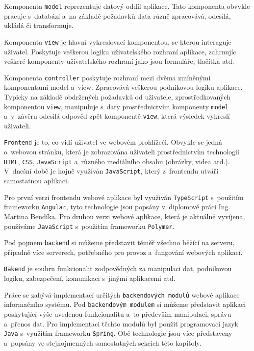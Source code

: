 \documentclass[twoside, 12pt]{article}
\begin{document}
{Komponenta \texttt{model} reprezentuje datový oddíl aplikace.
Tato komponenta obvykle pracuje s~databází a~na základě požadavků
data různě zpracovává, odesílá, ukládá či transformuje.

Komponenta \texttt{view} je hlavní vykreslovací komponentou, se kterou interaguje uživatel.
Poskytuje veškerou logiku uživatelského rozhraní aplikace,
zahrnujíc veškeré komponenty uživatelského rozhraní jako jsou formuláře, tlačítka
atd.

Komponenta \texttt{controller} poskytuje rozhraní mezi dvěma zmíněnými komponentami
model a~view. Zpracovává veškerou podnikovou logiku aplikace.
Typicky na základě obdržených požadavků od uživatele, zprostředkovaných komponentou
\texttt{view}, manipuluje s~daty prostřednictvím komponenty \texttt{model} a~v~závěru odesílá
odpověď zpět komponentě \texttt{view}, která výsledek vykreslí uživateli.



\texttt{Frontend} je to, co vidí uživatel ve webovém prohlížeči.
Obvykle se jedná o~webovou stránku, která je zobrazována uživateli prostřednictvím
technologií \texttt{HTML}, \texttt{CSS}, \texttt{JavaScript} a~různého mediálního obsahu (obrázky, videa atd.).
V~dnešní době je hojně využíván \texttt{JavaScript}, který z~frontendu utváří samostatnou aplikaci.

Pro první verzi frontendu webové aplikace byl využiván \texttt{TypeScript}
s~použitím frameworku \texttt{Angular},
tyto technologie jsou popsány v~diplomové práci Ing. Martina Bendíka.
Pro druhou verzi webové aplikace, která je aktuálně vyvíjena,
používáme \texttt{JavaScript} s~použitím frameworku \texttt{Polymer}.



Pod pojmem \texttt{backend} si můžeme představit téměř všechno běžící na serveru,
případně více serverech, potřebného pro provoz a~fungování webových aplikací.
\cite{odinuv}
\par
\texttt{Bakend} je souhrn funkcionalit zodpovědných za manipulaci dat,
podnikovou logiku, zabezpečení, komunikaci s~jinými aplikacemi atd.

Práce se zabývá implementací určitých \texttt{backendových modulů} webové aplikace informačního systému.
Pod \texttt{backendovým modulem} si můžeme představit aplikaci
poskytující výše uvedenou funkcionalitu a~to především manipulaci, správu a~přenos dat.
Pro implementaci těchto modulů byl použit programovací jazyk \texttt{Java} s~využitím frameworku \texttt{Spring}.
Obě technologie jsou více představeny a~popsány ve stejnojmenných samostatných sekcích této kapitoly.

}
\end{document}
